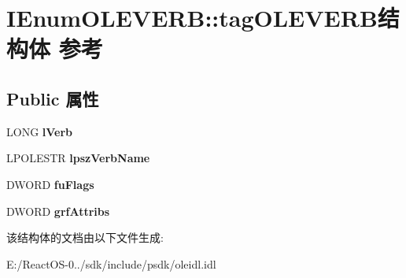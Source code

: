 \hypertarget{struct_i_enum_o_l_e_v_e_r_b_1_1tag_o_l_e_v_e_r_b}{}\section{I\+Enum\+O\+L\+E\+V\+E\+RB\+:\+:tag\+O\+L\+E\+V\+E\+R\+B结构体 参考}
\label{struct_i_enum_o_l_e_v_e_r_b_1_1tag_o_l_e_v_e_r_b}
\subsection*{Public 属性}
\begin{DoxyCompactItemize}
\item 
\mbox{\label{struct_i_enum_o_l_e_v_e_r_b_1_1tag_o_l_e_v_e_r_b_a4b1b7d06e6ed70e233a741782f520a49}} 
L\+O\+NG {\bfseries l\+Verb}
\item 
\mbox{\label{struct_i_enum_o_l_e_v_e_r_b_1_1tag_o_l_e_v_e_r_b_ac63bc902dcf6a34a48b0507d5ab47404}} 
L\+P\+O\+L\+E\+S\+TR {\bfseries lpsz\+Verb\+Name}
\item 
\mbox{\label{struct_i_enum_o_l_e_v_e_r_b_1_1tag_o_l_e_v_e_r_b_a112eda41ad6544a3788b3b8787e78e8b}} 
D\+W\+O\+RD {\bfseries fu\+Flags}
\item 
\mbox{\label{struct_i_enum_o_l_e_v_e_r_b_1_1tag_o_l_e_v_e_r_b_a6cfd70a9a9a8580acbd11afc749784aa}} 
D\+W\+O\+RD {\bfseries grf\+Attribs}
\end{DoxyCompactItemize}


该结构体的文档由以下文件生成\+:\begin{DoxyCompactItemize}
\item 
E\+:/\+React\+O\+S-\/0../sdk/include/psdk/oleidl.\+idl\end{DoxyCompactItemize}
